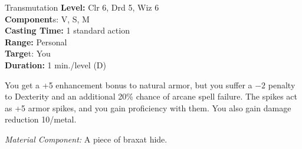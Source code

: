 {Transmutation}
{
	\textbf{Level:}
	Clr 6, Drd 5, Wiz 6\\
	\textbf{Component}s:
	V, S, M\\
	\textbf{Casting Time:}
	1 standard action\\
	\textbf{Range:}
	Personal\\
	\textbf{Targe}t:
	You\\
	\textbf{Duration:}
	1 min./level (D)\\
}
{
	You get a +5 enhancement bonus to natural armor, but you suffer a $-2$ penalty to Dexterity and an additional 20\% chance of arcane spell failure. The spikes act as +5 armor spikes, and you gain proficiency with them. You also gain damage reduction 10/metal.

	\textit{Material Component:} A piece of braxat hide.
}
